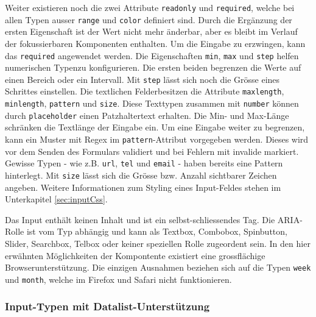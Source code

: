 Weiter existieren noch die zwei Attribute \texttt{readonly} und \texttt{required}, welche bei allen Typen ausser \texttt{range} und \texttt{color} definiert sind.
Durch die Ergänzung der ersten Eigenschaft ist der Wert nicht mehr änderbar, aber es bleibt im Verlauf der fokussierbaren Komponenten enthalten.
Um die Eingabe zu erzwingen, kann das \texttt{required} angewendet werden.
Die Eigenschaften \texttt{min}, \texttt{max} und \texttt{step} helfen numerischen Typen\footnotemark zu konfigurieren.
Die ersten beiden begrenzen die Werte auf einen Bereich oder ein Intervall.
Mit \texttt{step} lässt sich noch die Grösse eines Schrittes einstellen.
Die textlichen Felder\footnotemark besitzen die Attribute \texttt{maxlength}, \texttt{minlength}, \texttt{pattern} und \texttt{size}.
Diese Texttypen zusammen mit \texttt{number} können durch \texttt{placeholder} einen Patzhaltertext erhalten.
Die Min- und Max-Länge schränken die Textlänge der Eingabe ein.
Um eine Eingabe weiter zu begrenzen, kann ein Muster mit Regex im \texttt{pattern}-Attribut vorgegeben werden. 
Dieses wird vor dem Senden des Formulars validiert und bei Fehlern mit invalide markiert.
Gewisse Typen - wie z.B. \texttt{url}, \texttt{tel} und \texttt{email} - haben bereits eine Pattern hinterlegt.
Mit \texttt{size} lässt sich die Grösse bzw. Anzahl sichtbarer Zeichen angeben.
Weitere Informationen zum Styling eines Input-Feldes stehen im Unterkapitel \ref{sec:inputCss}.

Das Input enthält keinen Inhalt und ist ein selbst-schliessendes Tag.
Die ARIA-Rolle ist vom Typ abhängig und kann als Textbox, Combobox, Spinbutton, Slider, Searchbox, Telbox oder keiner speziellen Rolle zugeordent sein.
In den hier erwähnten Möglichkeiten der Kompontente existiert eine grossflächige Browserunterstützung.
Die einzigen Ausnahmen beziehen sich auf die Typen \texttt{week} und \texttt{month}, welche im Firefox und Safari nicht funktionieren.


\subsubsection{{\color{dgray} Input-Typen mit Datalist-Unterstützung}}
\label{sec:inutTypesDatalist}


